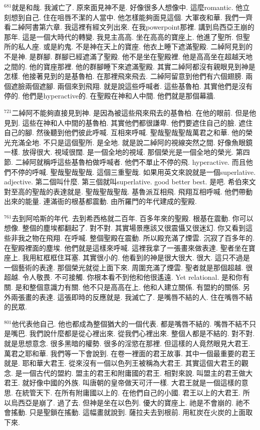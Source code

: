 \documentclass{book}
\begin{document}
$^{681}$就是和哉.
我滅亡了.
原來面見神不是.
好像很多人想像中.
這麼romantic.
他立刻想到自己.
住在咀唇不潔的人當中.
他怎樣能夠面見這個.
大軍夜和華.
我們一齊看二綽阿書第六章.
我這裡有經文列出來.
在我powerpoint那裡.
講到烏西亞王崩的那年.
這是一個大時代的轉變.
我見主高高.
坐在高高的寶座上.
他進了聖所.
但聖所的私人座.
或是約鬼.
不是神在天上的寶座.
他衣上睡下遮滿聖殿.
二綽阿見到的不是神.
是群腳.
群腳已經遮滿了聖殿.
他不是坐在聖殿裡.
他是高高坐在超越天地之間的.
他的寶座那裡.
他的群腳睡下來遮滿聖殿.
其實二綽阿都沒有親眼見到神是怎樣.
他接著見到的是基魯柏.
在那裡飛來飛去.
二綽阿留意到他們有六個翅膀.
兩個遮臉兩個遮腳.
兩個來到飛翔.
就是說這些呼喊者.
這些基魯柏.
其實他們是沒有停的.
他們是hyperactive的.
在聖殿在神和人中間.
他們就是那個幕牆.

$^{721}$二綽阿不能夠直接見到神.
是因為被這些飛來飛去的基魯柏.
在他的眼前.
但是他見到.
這些在神和人中間的基魯柏.
其實他們都很謙卑.
他們要遮住自己的臉.
遮住自己的腳.
然後聽到他們彼此呼喊.
互相來呼喊.
聖哉聖哉聖哉萬君之和華.
他的榮光充滿全地.
不只是這個聖所.
是全地.
就是說二綽阿的視線突然之間.
好像魚眼鏡一樣.
放得很大.
視域很闊.
是一個全地的視域.
那個榮光是一個全地的榮光.
第四節.
二綽阿就稱呼這些基魯柏做呼喊者.
他們不單止不停的飛.
hyperactive.
而且他們不停的呼喊.
聖哉聖哉聖哉.
這個三重聖哉.
如果用英文來說就是一個superlative.
adjective.
第二個叫什麼.
第三個就叫superlative.
good better best.
是吧.
希伯來文對至高的聖哉的表達就是.
聖哉聖哉聖哉.
基魯派互相飛.
飛翔互相呼喊.
他們帶動出來的能量.
連滿衙的根基都震動.
由所羅門的年代建成的聖殿.

$^{761}$去到阿哈斯的年代.
去到希西格就二百年.
百多年來的聖殿.
根基在震動.
你可以想像.
整個的塵埃都翻起了.
對不對.
其實場景應該又很震懾又很迷幻.
你又看到這些非我之物在飛翔.
在呼喊.
整個聖殿在震動.
所以殿充滿了煙雲.
沉寂了百多年的.
在聖殿裡面的塵埃.
他們就是這樣來呼喊.
這裡我拿了一張畫來做表達.
聖者坐在寶座上.
我用紅框框住耳塞.
其實很小的.
他看到的神是很大很大.
很大.
這只不過是一個藝術的表達.
那個榮光就從上面下來.
周圍充滿了煙雲.
聖者就是那個超越.
很超越.
令人敬畏.
不可接觸.
你根本看不到他和他很遙遠.
Yet relational.
是和你有關.
是和整個意識力有關.
他不只是高高在上.
他和人建立關係.
有盟約的關係.
另外兩張畫的表達.
這張即時的反應就是.
我滅亡了.
是嘴唇不結的人.
住在嘴唇不結的民眾.

$^{801}$他代表他自己.
他也都成為整個猶大的一個代表.
都是嘴唇不結的.
嘴唇不結不只是嘴巴.
我們說什麼都是從心裡出來.
從我們心裡出來.
整個人都是不結的.
對不對.
就是思想意念.
很多黑暗的權勢.
很多的淫慾在那裡.
但這樣的人竟然眼見大君王.
萬君之耶和華.
我們等一下會說到.
在卷一裡面的君王故事.
其中一個最重要的君王就是.
耶和華大君王.
從來沒有一個以色列王被稱為大君王.
其實這個大君王的觀念.
是一個古代的盟約.
盟主的君王和附庸國的君王.
相對來說.
叫盟主的君王做大君王.
就好像中國的外族.
叫唐朝的皇帝做天可汗一樣.
大君王就是一個這樣的意思.
在統管天下.
在所有附庸國以上的.
在他們自己的小國.
君王以上的大君王.
所以烏西亞是崩了.
過了去.
但神是坐在以色列.
優大的寶座上.
祂是不會崩的.
祂不會搖動.
只是聖鎖在搖動.
這幅畫就說到.
薩拉夫去到根前.
用紅炭在火炭的上面取下來.
\end{document}
